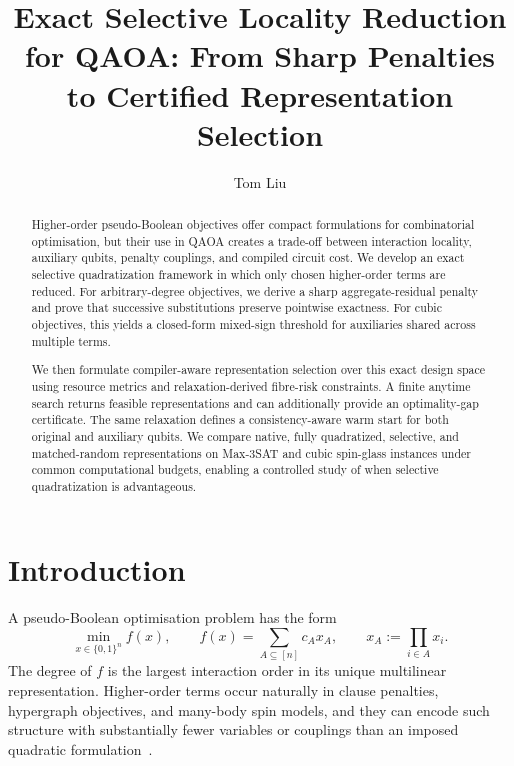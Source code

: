 \documentclass[a4paper,onecolumn,11pt,unpublished]{quantumarticle}
\title{Exact Selective Locality Reduction for QAOA: From Sharp Penalties to Certified Representation Selection}
\author{Tom Liu}
\affiliation{Department of Mathematics, University of Warwick, Coventry CV4 7AL, United Kingdom}
\theoremstyle{remark}
\begin{document}
\maketitle

\begin{abstract}
Higher-order pseudo-Boolean objectives offer compact formulations for combinatorial optimisation, but their use in QAOA creates a trade-off between interaction locality, auxiliary qubits, penalty couplings, and compiled circuit cost. We develop an exact selective quadratization framework in which only chosen higher-order terms are reduced. For arbitrary-degree objectives, we derive a sharp aggregate-residual penalty and prove that successive substitutions preserve pointwise exactness. For cubic objectives, this yields a closed-form mixed-sign threshold for auxiliaries shared across multiple terms.

We then formulate compiler-aware representation selection over this exact design space using resource metrics and relaxation-derived fibre-risk constraints. A finite anytime search returns feasible representations and can additionally provide an optimality-gap certificate. The same relaxation defines a consistency-aware warm start for both original and auxiliary qubits. We compare native, fully quadratized, selective, and matched-random representations on Max-3SAT and cubic spin-glass instances under common computational budgets, enabling a controlled study of when selective quadratization is advantageous.
\end{abstract}

\section{Introduction}
\label{sec:introduction}

A pseudo-Boolean optimisation problem has the form
\begin{equation}
    \min_{x\in\{0,1\}^{n}} f(x),
    \qquad
    f(x)=\sum_{A\subseteq[n]} c_A x_A,
    \qquad
    x_A:=\prod_{i\in A}x_i .
    \label{eq:intro-pbo}
\end{equation}
The degree of $f$ is the largest interaction order in its unique multilinear
representation.  Higher-order terms occur naturally in clause penalties,
hypergraph objectives, and many-body spin models, and they can encode such
structure with substantially fewer variables or couplings than an imposed
quadratic formulation~\cite{BorosHammer2002,Hadfield2021,Glos2022,CampbellDahl2022}.
\end{document}
